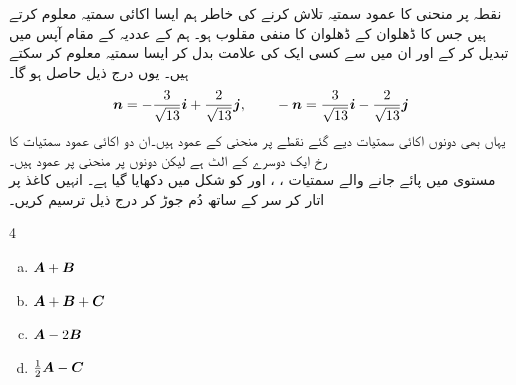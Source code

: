 نقطہ  پر منحنی کا عمود سمتیہ تلاش کرنے کی خاطر ہم ایسا اکائی سمتیہ معلوم کرتے ہیں جس کا ڈھلوان  کے  ڈھلوان کا  منفی مقلوب    ہو۔ ہم  کے عددیہ   کے مقام  آپس میں تبدیل کر کے اور ان میں سے کسی ایک کی علامت بدل کر ایسا سمتیہ معلوم کر سکتے ہیں۔ یوں درج ذیل حاصل ہو گا۔
\begin{align*}
{\ensuremath{{\boldsymbol{n}}}}=-\frac{3}{\sqrt{13}}{\boldsymbol{i}}+\frac{2}{\sqrt{13}}{\boldsymbol{j}},\quad \text{}\quad -{{\boldsymbol{n}}}=\frac{3}{\sqrt{13}}{\boldsymbol{i}}-\frac{2}{\sqrt{13}}{\boldsymbol{j}}
\end{align*}  
یہاں بھی دونوں اکائی سمتیات دیے گئے نقطے پر منحنی کے عمود ہیں۔ان    دو اکائی عمود سمتیات کا رخ ایک دوسرے کے الٹ ہے لیکن دونوں  پر منحنی پر عمود  ہیں۔
\\
مستوی میں پائے جانے والے سمتیات ، ،  اور  کو شکل  میں دکھایا گیا ہے۔ انہیں کاغذ پر اتار کر  سر کے ساتھ دُم جوڑ کر درج ذیل ترسیم کریں۔
\begin{multicols}{4}
\begin{enumerate}[a.]
\item
${{\boldsymbol{A}}}+{{\boldsymbol{B}}}$
\item
${{\boldsymbol{A}}}+{{\boldsymbol{B}}}+{{\boldsymbol{C}}}$
\item
${{\boldsymbol{A}}}-2{{\boldsymbol{B}}}$
\item
$\frac{1}{2}{{\boldsymbol{A}}}-{{\boldsymbol{C}}}$
\end{enumerate}
\end{multicols}
